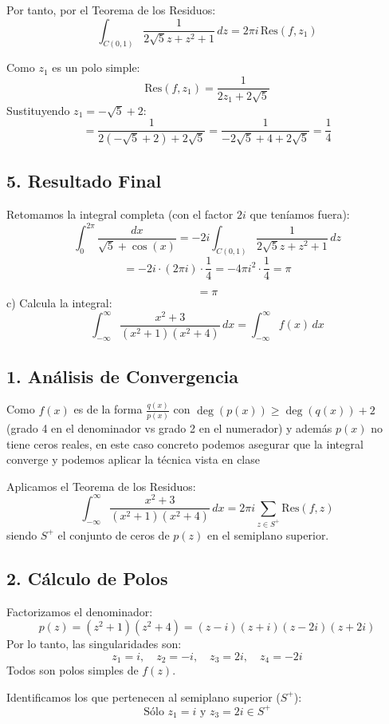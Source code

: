 {Por tanto, por el Teorema de los Residuos:
\[
\int_{C(0,1)} \frac{1}{2\sqrt{5}z + z^2 + 1} \, dz = 2\pi i \, \text{Res}(f, z_1)
\]

Como $z_1$ es un polo simple:
\[
\text{Res}(f, z_1) = \frac{1}{2z_1 + 2\sqrt{5}}
\]
Sustituyendo $z_1 = -\sqrt{5} + 2$:
\[
= \frac{1}{2(-\sqrt{5} + 2) + 2\sqrt{5}} = \frac{1}{-2\sqrt{5} + 4 + 2\sqrt{5}} = \frac{1}{4}
\]

\subsection*{5. Resultado Final}

Retomamos la integral completa (con el factor $2i$ que teníamos fuera):
\[
\int_{0}^{2\pi} \frac{dx}{\sqrt{5} + \cos(x)} = -2i \int_{C(0,1)} \frac{1}{2\sqrt{5}z + z^2 + 1} \, dz
\]
\[
= -2i \cdot (2\pi i) \cdot \frac{1}{4} = -4\pi i^2 \cdot \frac{1}{4} = \pi
\]

\[
\boxed{ = \pi }
\]
c) Calcula la integral:
\[
\int_{-\infty}^{\infty} \frac{x^2+3}{(x^2+1)(x^2+4)} \, dx = \int_{-\infty}^{\infty} f(x) \, dx
\]

\subsection*{1. Análisis de Convergencia}

Como $f(x)$ es de la forma $\frac{q(x)}{p(x)}$ con $\deg(p(x)) \ge \deg(q(x)) + 2$ (grado 4 en el denominador vs grado 2 en el numerador) y además $p(x)$ no tiene ceros reales, 
en este caso concreto podemos asegurar que la integral converge y podemos aplicar la técnica vista en clase

Aplicamos el Teorema de los Residuos:
\[
\int_{-\infty}^{\infty} \frac{x^2+3}{(x^2+1)(x^2+4)} \, dx = 2\pi i \sum_{z \in S^+} \text{Res}(f, z)
\]
siendo $S^+$ el conjunto de ceros de $p(z)$ en el semiplano superior.

\subsection*{2. Cálculo de Polos}

Factorizamos el denominador:
\[
p(z) = (z^2+1)(z^2+4) = (z-i)(z+i)(z-2i)(z+2i)
\]
Por lo tanto, las singularidades son:
\[
z_1 = i, \quad z_2 = -i, \quad z_3 = 2i, \quad z_4 = -2i
\]
Todos son polos simples de $f(z)$.

Identificamos los que pertenecen al semiplano superior ($S^+$):
\[
\text{Sólo } z_1 = i \text{ y } z_3 = 2i \in S^+
\]

}
